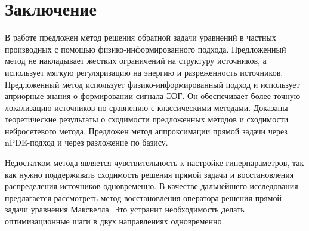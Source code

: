 \documentclass[a4paper,14pt,oneside,openany]{extarticle}
\begin{document}
\section{Заключение}
В работе предложен метод решения обратной задачи уравнений в частных производных с помощью 
физико-информированного подхода. Предложенный метод не накладывает
жестких ограничений на структуру источников, а использует мягкую регуляризацию на энергию 
и разреженность источников. Предложенный метод использует физико-информированный подход и 
использует априорные знания о формировании сигнала ЭЭГ. Он обеспечивает более точную 
локализацию источников по сравнению с классическими методами. Доказаны теоретические результаты 
о сходимости предложенных методов и сходимости нейросетевого метода.
Предложен метод аппроксимации прямой задачи через nPDE-подход и через разложение по базису.

Недостатком метода является чувствительность к настройке гиперпараметров, так как нужно поддерживать сходимость 
решения прямой задачи и восстановления 
распределения источников одновременно. В качестве дальнейшего исследования предлагается рассмотреть 
метод восстановления оператора решения прямой задачи уравнения Максвелла.
Это устранит необходимость делать оптимизационные шаги в двух направлениях одновременно.

\newpage

\end{document}
